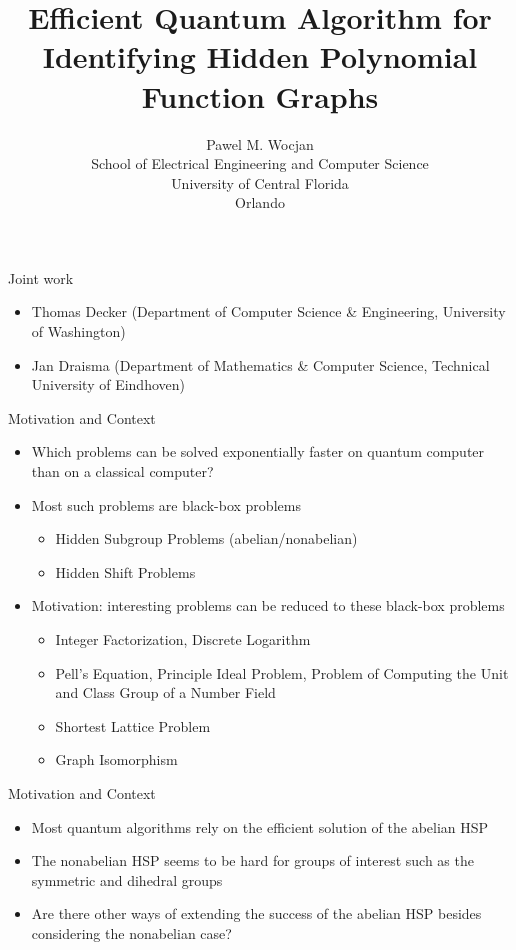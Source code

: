 \documentclass[slideColor]{prosper}
\title{Efficient Quantum Algorithm for Identifying Hidden Polynomial Function Graphs}
\author{Pawel M. Wocjan\\[1ex]School of Electrical Engineering and Computer Science\\ University of Central Florida\\Orlando}
\renewcommand{\>}{\rangle}
\newcommand{\<}{\langle}
\begin{document}
\maketitle


\begin{slide}{Joint work}
\begin{itemize}
\item Thomas Decker (Department of Computer Science \& Engineering, University of Washington)
\item Jan Draisma (Department of Mathematics \& Computer Science, Technical University of Eindhoven)
\end{itemize}
\end{slide}


\begin{slide}{Motivation and Context}

\begin{itemize}
\item Which problems can be solved exponentially faster on quantum computer than on a classical computer?
\item Most such problems are black-box problems
\begin{itemize}
\item Hidden Subgroup Problems (abelian/nonabelian)
\item Hidden Shift Problems
\end{itemize}
\item Motivation: interesting problems can be reduced to these black-box problems
\begin{itemize}
\item Integer Factorization, Discrete Logarithm
\item Pell's Equation, Principle Ideal Problem, Problem of Computing the Unit and Class Group of a Number Field
\item Shortest Lattice Problem
\item Graph Isomorphism
\end{itemize}
\end{itemize}
\end{slide}


\begin{slide}{Motivation and Context}
\begin{itemize}
\item Most quantum algorithms rely on the efficient solution of the abelian HSP
\item The nonabelian HSP seems to be hard for groups of interest such as the symmetric and dihedral groups
\item Are there other ways of extending the success of the abelian HSP besides considering the nonabelian case?
\end{itemize}
\end{slide}
\end{document}

